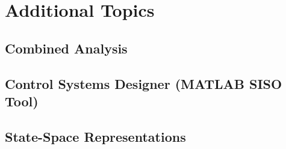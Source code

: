 \documentclass[12pt,letter]{article}
\begin{document}
	
%	

	\setcounter{section}{8}	
	\setcounter{figure}{\thesection}   
	\renewcommand\thefigure{\thesection.\arabic{figure}}
	\setcounter{equation}{\thesection}   
	\renewcommand\theequation{\thesection.\arabic{equation}}

\section{Additional Topics}

\subsection{Combined Analysis}


\subsection{Control Systems Designer (MATLAB SISO Tool)}


\subsection{State-Space Representations}










	\pagebreak
	\renewcommand{\thepage}{}
	\renewcommand\refname{References Cited}
	\pagestyle{plain}
	
	
\end{document}
